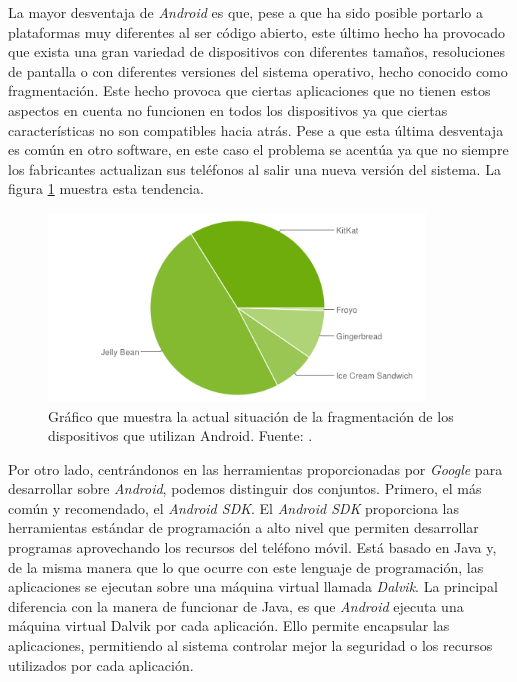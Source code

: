 La mayor desventaja de \textit{Android} es que, pese a que ha sido posible portarlo a plataformas muy diferentes al ser código abierto, este último hecho ha provocado que exista una gran variedad de dispositivos con diferentes tamaños, resoluciones de pantalla o con diferentes versiones del sistema operativo, hecho conocido como fragmentación. Este hecho provoca que ciertas aplicaciones que no tienen estos aspectos en cuenta no funcionen en todos los dispositivos ya que ciertas características no son compatibles hacia atrás. Pese a que esta última desventaja es común en otro software, en este caso el problema se acentúa ya que no siempre los fabricantes actualizan sus teléfonos al salir una nueva versión del sistema. La figura \ref{fig:Frangmentacion1} muestra esta tendencia.\newline

\begin{figure}[ht]
\begin{center}
\includegraphics[width=10cm]{imatges/chart.png}
\caption{Gráfico que muestra la actual situación de la fragmentación de los dispositivos que utilizan Android. Fuente: \cite{android2}.}
\label{fig:Frangmentacion1}
\end{center}
\end{figure}

Por otro lado, centrándonos en las herramientas proporcionadas por \textit{Google} para desarrollar sobre \textit{Android}, podemos distinguir dos conjuntos. Primero, el más común y recomendado, el \textit{Android \textit{SDK}}. El \textit{Android \textit{SDK}} proporciona las herramientas estándar de programación a alto nivel que permiten desarrollar programas aprovechando los recursos del teléfono móvil. Está basado en Java y, de la misma manera que lo que ocurre con este lenguaje de programación, las aplicaciones se ejecutan sobre una máquina virtual llamada \textit{Dalvik}\cite{wiki4}. La principal diferencia con la manera de funcionar de Java, es que \textit{Android} ejecuta una máquina virtual Dalvik por cada aplicación. Ello permite encapsular las aplicaciones, permitiendo al sistema controlar mejor la seguridad o los recursos utilizados por cada aplicación.\newline

